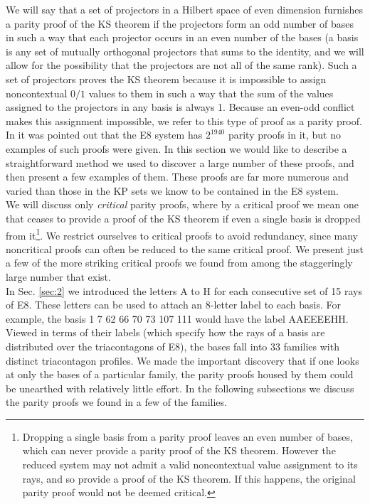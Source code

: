 We will say that a set of projectors in a Hilbert space of even dimension furnishes a parity proof of the KS theorem if the projectors form an odd number of bases in such a way that each projector occurs in an even number of the bases (a basis is any set of mutually orthogonal projectors that sums to the identity, and we will allow for the possibility that the projectors are not all of the same rank). Such a set of projectors proves the KS theorem because it is impossible to assign noncontextual $0/1$ values to them in such a way that the sum of the values assigned to the projectors in any basis is always 1. Because an even-odd conflict makes this assignment impossible, we refer to this type of proof as a parity proof. In \cite{lisonek1} it was pointed out that the E8 system has $2^{1940}$ parity proofs in it, but no examples of such proofs were given. In this section we would like to describe a straightforward method we used to discover a large number of these proofs, and then present a few examples of them. These proofs are far more numerous and varied than those in the KP sets we know to be contained in the E8 system.\\

We will discuss only \textit{critical} parity proofs, where by a critical proof we mean one that ceases to provide a proof of the KS theorem if even a single basis is dropped from it\footnote{Dropping a single basis from a parity proof leaves an even number of bases, which can never provide a parity proof of the KS theorem. However the reduced system may not admit a valid noncontextual value assignment to its rays, and so provide a proof of the KS theorem. If this happens, the original parity proof would not be deemed critical.}. We restrict ourselves to critical proofs to avoid redundancy, since many noncritical proofs can often be reduced to the same critical proof. We present just a few of the more striking critical proofs we found from among the staggeringly large number that exist.\\

In Sec. \ref{sec:2} we introduced the letters A to H for each consecutive set of 15 rays of E8. These letters can be used to attach an 8-letter label to each basis. For example, the basis 1 7 62 66 70 73 107 111 would have the label AAEEEEHH. Viewed in terms of their labels (which specify how the rays of a basis are distributed over the triacontagons of E8), the bases fall into 33 families with distinct triacontagon profiles. We made the important discovery that if one looks at only the bases of a particular family, the parity proofs housed by them could be unearthed with relatively little effort. In the following subsections we discuss the parity proofs we found in a few of the families.

